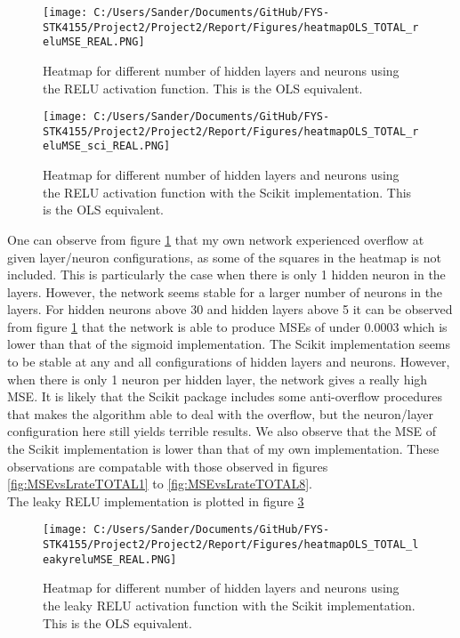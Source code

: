\documentclass[12pt,a4paper]{article}
\begin{document}
\begin{figure}[H]
\centering
\texttt{[image: C:/Users/Sander/Documents/GitHub/FYS-STK4155/Project2/Project2/Report/Figures/heatmapOLS\_TOTAL\_reluMSE\_REAL.PNG]}
\caption{\label{fig:heatmap2} Heatmap for different number of hidden layers and neurons using the RELU activation function. This is the OLS equivalent.}
\end{figure}

\begin{figure}[H]
\centering
\texttt{[image: C:/Users/Sander/Documents/GitHub/FYS-STK4155/Project2/Project2/Report/Figures/heatmapOLS\_TOTAL\_reluMSE\_sci\_REAL.PNG]}
\caption{\label{fig:heatmap3} Heatmap for different number of hidden layers and neurons using the RELU activation function with the Scikit implementation. This is the OLS equivalent.}
\end{figure}

\noindent One can observe from figure \ref{fig:heatmap2} that my own network experienced overflow at given layer/neuron configurations, as some of the squares in the heatmap is not included. This is particularly the case when there is only 1 hidden neuron in the layers. However, the network seems stable for a larger number of neurons in the layers. For hidden neurons above 30 and hidden layers above 5 it can be observed from figure \ref{fig:heatmap2} that the network is able to produce MSEs of under $0.0003$ which is lower than that of the sigmoid implementation. The Scikit implementation seems to be stable at any and all configurations of hidden layers and neurons. However, when there is only 1 neuron per hidden layer, the network gives a really high MSE. It is likely that the Scikit package includes some anti-overflow procedures that makes the algorithm able to deal with the overflow, but the neuron/layer configuration here still yields terrible results. We also observe that the MSE of the Scikit implementation is lower than that of my own implementation. These observations are compatable with those observed in figures \ref{fig:MSEvsLrateTOTAL1} to \ref{fig:MSEvsLrateTOTAL8}. 
\\
The leaky RELU implementation is plotted in figure \ref{fig:heatmap4}

\begin{figure}[H]
\centering
\texttt{[image: C:/Users/Sander/Documents/GitHub/FYS-STK4155/Project2/Project2/Report/Figures/heatmapOLS\_TOTAL\_leakyreluMSE\_REAL.PNG]}
\caption{\label{fig:heatmap4} Heatmap for different number of hidden layers and neurons using the leaky RELU activation function with the Scikit implementation. This is the OLS equivalent.}
\end{figure}
\end{document}
